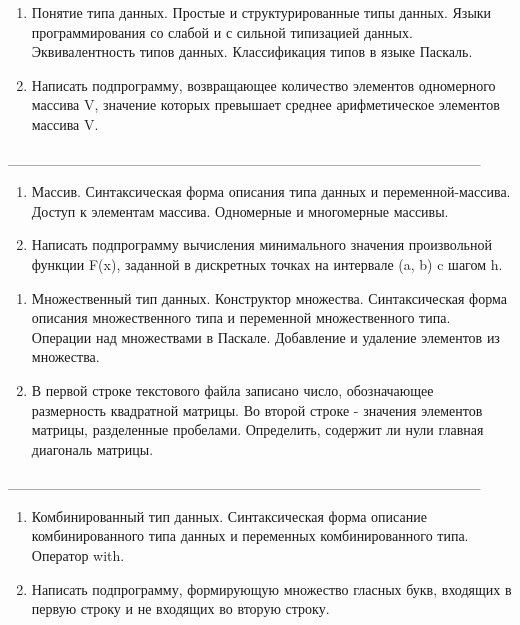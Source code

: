 \documentclass[oneside, final, 14pt]{extreport}
\begin{document}

\begin{enumerate}
\item Понятие типа данных. Простые и структурированные типы данных. Языки программирования со слабой и с сильной типизацией данных. Эквивалентность типов данных.
Классификация типов в языке Паскаль.
\item Написать подпрограмму, возвращающее количество элементов одномерного массива V, значение которых превышает среднее арифметическое элементов массива V.
\end{enumerate}


\_\_\_\_\_\_\_\_\_\_\_\_\_\_\_\_\_\_\_\_\_\_\_\_\_\_\_\_\_\_\_\_\_\_\_\_\_\_\_\_\_\_\_\_\_


\begin{enumerate}
\item Массив. Синтаксическая форма описания типа данных и переменной-массива.
Доступ к элементам массива. Одномерные и многомерные массивы.
\item Написать подпрограмму вычисления минимального значения произвольной функции F(x), заданной в дискретных точках на интервале (a, b) c шагом h.
\end{enumerate}


\newpage


\begin{enumerate}
\item Множественный тип данных. Конструктор множества. 
Синтаксическая форма описания множественного типа и переменной множественного типа.
Операции над множествами в Паскале. Добавление и удаление элементов из множества.
\item В первой строке текстового файла записано число, обозначающее размерность квадратной матрицы. Во второй строке - значения элементов матрицы, разделенные пробелами. 
Определить, содержит ли нули главная диагональ матрицы.
\end{enumerate}


\_\_\_\_\_\_\_\_\_\_\_\_\_\_\_\_\_\_\_\_\_\_\_\_\_\_\_\_\_\_\_\_\_\_\_\_\_\_\_\_\_\_\_\_\_


\begin{enumerate}
\item Комбинированный тип данных. Синтаксическая форма описание комбинированного типа данных 
    и переменных комбинированного типа. Оператор with.
\item Написать подпрограмму, формирующую множество гласных букв, входящих в первую строку
   и не входящих во вторую строку.
\end{enumerate}

\end{document}

